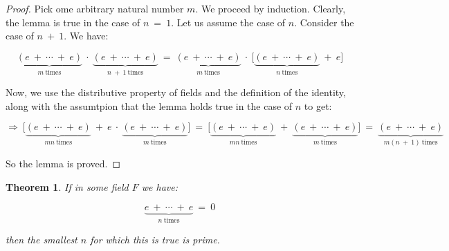 \documentclass[10pt, oneside]{article}
\newtheorem{thm}{Theorem}
\begin{document}
\begin{proof}
	Pick ome arbitrary natural number $m$. We proceed by induction. Clearly, the lemma is true in 
	the case of $n \ = \ 1$. Let us assume the case of $n$. Consider the case of $n \ + \ 1$. We have:
	
	$$\underbrace{(e \ + \ \cdots \ + \ e)}_{m \ \text{times}} \ \cdot \ \underbrace{(e \ + \ 
	\cdots \ + \ e)}_{n \ + \ 1 \ \text{times}} \ = \ \underbrace{(e \ + \ \cdots \ + \ e)}_{m \ \text{times}} \ \cdot \ \big[ \underbrace{(e \ + \ 
\cdots \ + \ e)}_{n \ \text{times}} \ + \ e \big]$$

  Now, we use the distributive property of fields and the definition of the identity, along with the assumtpion that
  the lemma holds true in the case of $n$ to get:

$$\Rightarrow \ \big[ \underbrace{(e \ + \ 
\cdots \ + \ e)}_{mn \ \text{times}} \ + \ e \ \cdot \  \underbrace{(e \ + \ \cdots \ + \ e)}_{m \ \text{times}} \big] \ = \ 
\big[ \underbrace{(e \ + \ 
\cdots \ + \ e)}_{mn \ \text{times}} \ + \ \underbrace{(e \ + \ \cdots \ + \ e)}_{m \ \text{times}} \big] \ = \ 
\underbrace{(e \ + \ 
\cdots \ + \ e)}_{m(n \ + \ 1) \ \text{times}}$$ 

So the lemma is proved.

\end{proof}

\begin{thm}
	If in some field $F$ we have:

	$$\underbrace{e \ + \ \cdots \ + \ e}_{n \ \text{times}} \ = \ 0$$

	then the smallest $n$ for which this is true is prime.
\end{thm}
\end{document}
